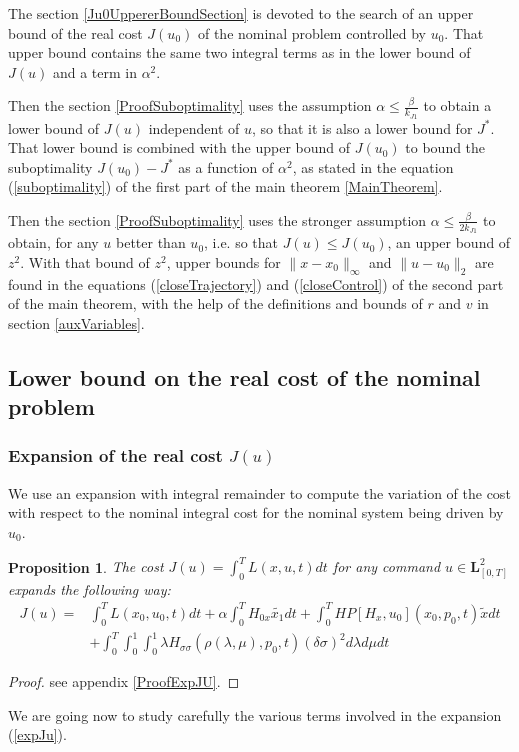 \documentclass[a4paper,10pt]{article}
\newtheorem{proposition}{Proposition}
\begin{document}
The section \ref{Ju0UppererBoundSection} is devoted to the search of 
an upper bound of the real cost $J(u_{0})$ of the nominal problem 
controlled by $u_{0}$. That upper bound contains the same two integral terms 
as in the lower bound of $J(u)$ and a term in $\alpha^{2}$.

Then the section \ref{ProofSuboptimality} uses the assumption $\alpha 
\leq \frac{\beta}{k_{J1}}$ to obtain a lower bound of $J(u)$ 
independent of $u$, so that it is also a lower bound for $J^{*}$. 
That lower bound is combined with the upper bound of $J(u_{0})$ 
to bound the suboptimality $J(u_{0})-J^{*}$ as a function of 
$\alpha^{2}$, as stated in 
the equation (\ref{suboptimality}) of the first 
part of the main theorem \ref{MainTheorem}.

Then the section \ref{ProofSuboptimality} uses the stronger assumption $\alpha 
\leq \frac{\beta}{2k_{J1}}$ to obtain, for any $u$ better than 
$u_{0}$, i.e. so that $J(u) \leq J(u_{0})$, an upper bound of 
$z^{2}$. With that bound of $z^{2}$, upper bounds for $\|x-x_{0}\|_{\infty}$ and $ 
\|u-u_{0}\|_{2}$ are found in the equations (\ref{closeTrajectory}) and (\ref{closeControl}) of 
the second part of the main theorem, with the help of the definitions and bounds 
of $r$ and $v$ in section \ref{auxVariables}.

\subsection{Lower bound on the real cost of the nominal problem}\label{JuLowerBoundSection}
\subsubsection{Expansion of the real cost $J(u)$}
We use an expansion with integral remainder to compute the variation 
of the cost with respect to the nominal integral cost for the nominal system 
being driven by $u_{0}$.
\begin{proposition}\label{expJuProp}
    The cost $J(u) = \int_{0}^{T} L(x,u,t) dt$ for any command $u \in \mathbf{L}_{[0,T]}^{2}$ 
    expands the following way:
    \begin{equation}
		\begin{split}
        J(u) = & \int_{0}^{T} L(x_{0},u_{0},t) dt
	+ \alpha \int_{0}^{T} H_{0x} \tilde{x_{1}} dt
	+ \int_{0}^{T} HP[H_{x},u_{0}](x_{0},p_{0},t) \tilde{x} dt 
	\\
	& + \int_{0}^{T} \int_{0}^{1} \int_{0}^{1} \lambda H_{\sigma 
	\sigma}(\rho(\lambda,\mu),p_{0},t)(\delta \sigma)^{2}  
	d \lambda d \mu dt
	\end{split}
        \label{expJu}
    \end{equation}
\end{proposition}
\begin{proof}
    see appendix \ref{ProofExpJU}.
\end{proof}
We are going now to study carefully the various terms involved in the 
expansion (\ref{expJu}).
\end{document}
